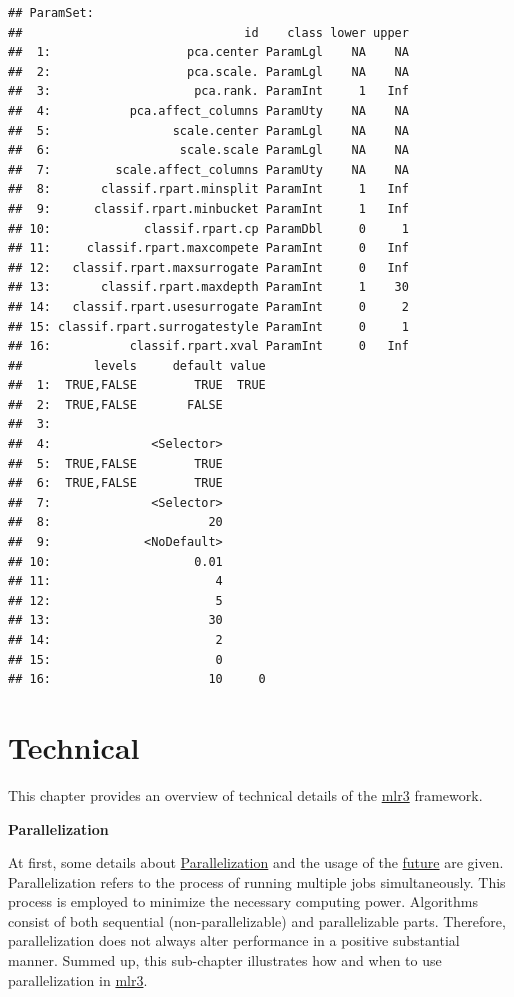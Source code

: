 \documentclass[]{article}
\begin{document}
\begin{verbatim}
## ParamSet: 
##                               id    class lower upper
##  1:                   pca.center ParamLgl    NA    NA
##  2:                   pca.scale. ParamLgl    NA    NA
##  3:                    pca.rank. ParamInt     1   Inf
##  4:           pca.affect_columns ParamUty    NA    NA
##  5:                 scale.center ParamLgl    NA    NA
##  6:                  scale.scale ParamLgl    NA    NA
##  7:         scale.affect_columns ParamUty    NA    NA
##  8:       classif.rpart.minsplit ParamInt     1   Inf
##  9:      classif.rpart.minbucket ParamInt     1   Inf
## 10:             classif.rpart.cp ParamDbl     0     1
## 11:     classif.rpart.maxcompete ParamInt     0   Inf
## 12:   classif.rpart.maxsurrogate ParamInt     0   Inf
## 13:       classif.rpart.maxdepth ParamInt     1    30
## 14:   classif.rpart.usesurrogate ParamInt     0     2
## 15: classif.rpart.surrogatestyle ParamInt     0     1
## 16:           classif.rpart.xval ParamInt     0   Inf
##          levels     default value
##  1:  TRUE,FALSE        TRUE  TRUE
##  2:  TRUE,FALSE       FALSE      
##  3:                              
##  4:              <Selector>      
##  5:  TRUE,FALSE        TRUE      
##  6:  TRUE,FALSE        TRUE      
##  7:              <Selector>      
##  8:                      20      
##  9:             <NoDefault>      
## 10:                    0.01      
## 11:                       4      
## 12:                       5      
## 13:                      30      
## 14:                       2      
## 15:                       0      
## 16:                      10     0
\end{verbatim}

\hypertarget{technical}{%
\section{Technical}\label{technical}}

This chapter provides an overview of technical details of the \href{https://mlr3.mlr-org.com}{mlr3} framework.

\textbf{Parallelization}

At first, some details about \protect\hyperlink{parallelization}{Parallelization} and the usage of the \href{https://cran.r-project.org/package=future}{future} are given.
Parallelization refers to the process of running multiple jobs simultaneously.
This process is employed to minimize the necessary computing power.
Algorithms consist of both sequential (non-parallelizable) and parallelizable parts.
Therefore, parallelization does not always alter performance in a positive substantial manner.
Summed up, this sub-chapter illustrates how and when to use parallelization in \href{https://mlr3.mlr-org.com}{mlr3}.
\end{document}
